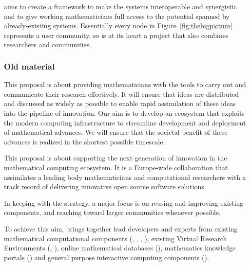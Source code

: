 \TheProject aims to create a framework to make the
systems interoperable and synergistic and to give working mathematicians full access to
the potential spanned by already-existing systems. Essentially every node in
Figure~\ref{fig:thebigpicture} represents a user community, so \TheProject is at its heart
a project that also combines researchers and communities.


\subsubsection{Old material}

This proposal is about providing mathematicians with the tools to
carry out and communicate their research effectively. It will ensure that ideas are
distributed and discussed as widely as possible to enable rapid
assimilation of these ideas into the pipeline of innovation. Our aim
is to develop an ecosystem that exploits the modern computing
infrastructure to streamline development and deployment of
mathematical advances. We will ensure that the societal benefit of
these advances is realized in the shortest possible timescale.

This proposal is about supporting the next generation of innovation in
the mathematical computing ecosystem. It is a Europe-wide
collaboration that assimilates a leading body mathematicians and
computational researchers with a track record of delivering innovative
open source software solutions.

In keeping with the \Sage strategy, a major focus is on reusing and
improving existing components, and reaching toward larger communities
whenever possible. 

\begin{center}
  \begin{boxedminipage}{.95\textwidth}\em

    To achieve this aim, \TheProject brings together lead developers
    and experts from existing mathematical computational components
    (\Linbox, \GAP, \Sage, \Singular), existing Virtual Research
    Environments (\SMC, \Simulagora), online mathematical databases
    (\LMFDB), mathematics knowledge portals (\MathHub) and general
    purpose interactive computing components (\Jupyter).

  \end{boxedminipage}
\end{center}


